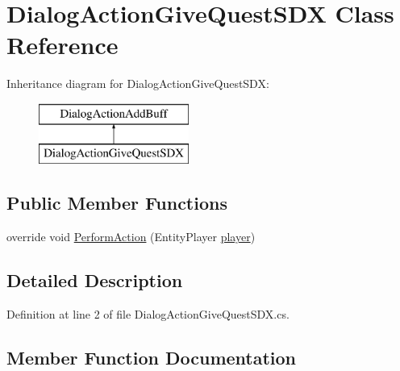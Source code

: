 \hypertarget{class_dialog_action_give_quest_s_d_x}{}\section{Dialog\+Action\+Give\+Quest\+S\+DX Class Reference}
\label{class_dialog_action_give_quest_s_d_x}
Inheritance diagram for Dialog\+Action\+Give\+Quest\+S\+DX\+:\begin{figure}[H]
\begin{center}
\leavevmode
\includegraphics[height=2.000000cm]{d6/de6/class_dialog_action_give_quest_s_d_x}
\end{center}
\end{figure}
\subsection*{Public Member Functions}
\begin{DoxyCompactItemize}
\item 
override void \mbox{\hyperlink{class_dialog_action_give_quest_s_d_x_a77aeb95e9da802b38f793ab608a1ad25}{Perform\+Action}} (Entity\+Player \mbox{\hyperlink{_sphere_i_i_01_music_01_boxes_2_config_2_localization_8txt_a4e2cb8aeff651600ea1cc57fe5a929a4}{player}})
\end{DoxyCompactItemize}


\subsection{Detailed Description}


Definition at line 2 of file Dialog\+Action\+Give\+Quest\+S\+D\+X.\+cs.



\subsection{Member Function Documentation}
\mbox{\label{class_dialog_action_give_quest_s_d_x_a77aeb95e9da802b38f793ab608a1ad25}} 
